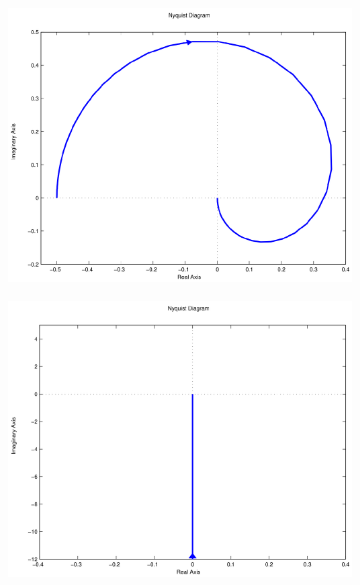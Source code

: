 \documentclass[twoside]{article}
\begin{document}
\begin{figure}[htbp]
\medskip
\begin{subfigure}{0.25\textwidth}
  \includegraphics[width=\linewidth]{zadani12-d}
  \caption{}
  \label{fig:frekchar:d}
\end{subfigure}\hfil %
\begin{subfigure}{0.25\textwidth}
	\includegraphics[width=\linewidth]{zadani12-e}
	\caption{}
	\label{fig:frekchar:e}
\end{subfigure}\hfil %
\begin{subfigure}{0.25\textwidth}

\end{subfigure}
\end{figure}
\end{document}
